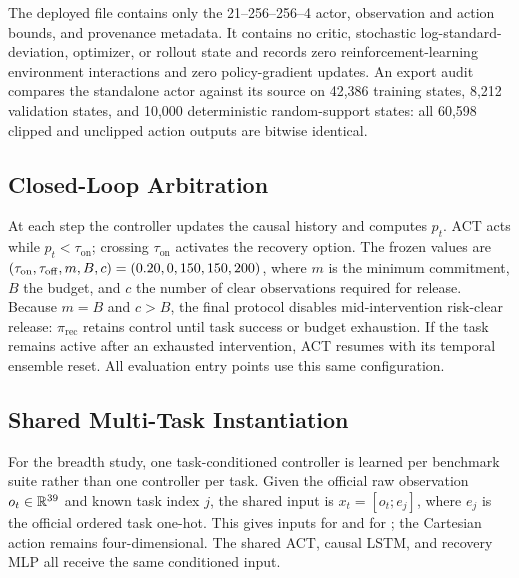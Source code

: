 \documentclass[conference]{IEEEtran}
\newcommand{\policyrec}{\pi_{\mathrm{rec}}}
\begin{document}
The deployed file contains only the 21--256--256--4 actor, observation and
action bounds, and provenance metadata. It contains no critic, stochastic
log-standard-deviation, optimizer, or rollout state and records zero
reinforcement-learning environment interactions and zero policy-gradient
updates. An export audit compares the standalone actor against its source on
42,386 training states, 8,212 validation states, and 10,000 deterministic
random-support states: all 60,598 clipped and unclipped action outputs are
bitwise identical.

\subsection{Closed-Loop Arbitration}

At each step the controller updates the causal history and computes $p_t$. ACT
acts while $p_t<\tau_{\mathrm{on}}$; crossing $\tau_{\mathrm{on}}$ activates
the recovery option. The frozen values are
$(\tau_{\mathrm{on}},\tau_{\mathrm{off}},m,B,c)=
(0.20,0,
150,150,
200)$, where $m$ is the minimum commitment, $B$ the
budget, and $c$ the number of clear observations required for release. Because
$m=B$ and $c>B$, the final protocol disables mid-intervention risk-clear
release: $\policyrec$ retains control until task success or budget exhaustion.
If the task remains active after an exhausted intervention, ACT resumes with its
temporal ensemble reset. All evaluation entry points use this same
configuration.

\subsection{Shared Multi-Task Instantiation}

For the breadth study, one task-conditioned controller is learned per benchmark
suite rather than one controller per task. Given the official raw observation
$o_t\in\mathbb{R}^{39}$ and known task index $j$, the shared
input is $x_t=[o_t;e_j]$, where $e_j$ is the official ordered task one-hot. This
gives \MTTenStateDim{} inputs for \MTTenBenchmark{} and \MTFiftyStateDim{} for
\MTFiftyBenchmark{}; the Cartesian action remains four-dimensional. The shared
ACT, causal LSTM, and recovery MLP all receive the same conditioned input.
\end{document}
